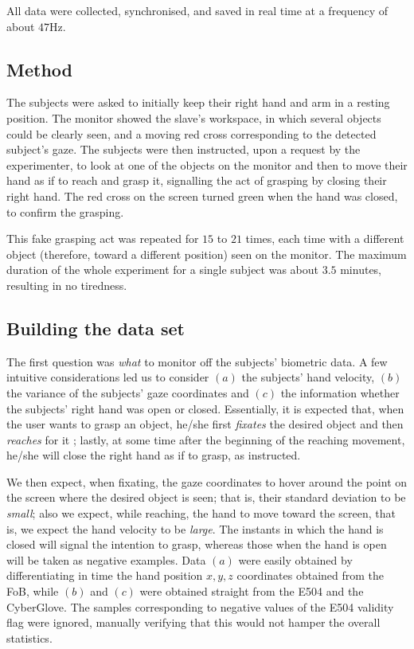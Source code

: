 \documentclass[a4paper,10pt,conference]{ieeeconf}
\begin{document}
All data were collected, synchronised, and saved in real time at a
frequency of about $47$Hz.

\subsection{Method}

The subjects were asked to initially keep their right hand and arm in
a resting position. The monitor showed the slave's workspace, in which
several objects could be clearly seen, and a moving red cross
corresponding to the detected subject's gaze. The subjects were then
instructed, upon a request by the experimenter, to look at one of the
objects on the monitor and then to move their hand as if to reach and
grasp it, signalling the act of grasping by closing their right
hand. The red cross on the screen turned green when the hand was
closed, to confirm the grasping.

This fake grasping act was repeated for $15$ to $21$ times, each time
with a different object (therefore, toward a different position) seen
on the monitor. The maximum duration of the whole experiment for a
single subject was about $3.5$ minutes, resulting in no tiredness.

\subsection{Building the data set}
\label{subsec:dataset}

The first question was \emph{what} to monitor off the subjects'
biometric data. A few intuitive considerations led us to consider
$(a)$ the subjects' hand velocity, $(b)$ the variance of the subjects'
gaze coordinates and $(c)$ the information whether the subjects' right
hand was open or closed. Essentially, it is expected that, when the
user wants to grasp an object, he/she first \emph{fixates} the desired
object and then \emph{reaches} for it \cite{...}; lastly, at some time
after the beginning of the reaching movement, he/she will close the
right hand as if to grasp, as instructed.

We then expect, when fixating, the gaze coordinates to hover around
the point on the screen where the desired object is seen; that is,
their standard deviation to be \emph{small}; also we expect, while
reaching, the hand to move toward the screen, that is, we expect the
hand velocity to be \emph{large}. The instants in which the hand is
closed will signal the intention to grasp, whereas those when the hand
is open will be taken as negative examples. Data $(a)$ were easily
obtained by differentiating in time the hand position $x,y,z$
coordinates obtained from the FoB, while $(b)$ and $(c)$ were obtained
straight from the E504 and the CyberGlove. The samples corresponding
to negative values of the E504 validity flag were ignored, manually
verifying that this would not hamper the overall statistics.
\end{document}
